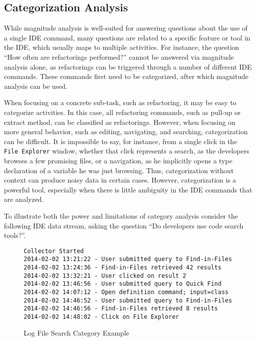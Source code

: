 \subsection{Categorization Analysis}

While magnitude analysis is well-suited for answering questions about the use of a single IDE command, many questions are related to a specific feature or tool in the IDE, which usually maps to multiple activities. For instance, the question ``How often are refactorings performed?'' cannot be answered via magnitude analysis alone, as refactorings can be triggered through a number of different IDE commands. These commands first need to be categorized, after which magnitude analysis can be used. 

When focusing on a concrete sub-task, such as refactoring, it may be easy to categorize activities. In this case, all refactoring commands, such as pull-up or extract method, can be classified as refactorings. However, when focusing on more general behavior, such as editing, navigating, and searching, categorization can be difficult. It is impossible to say, for instance, from a single click in the {\tt File Explorer} window, whether that click represents a search, as the developers browses a few promising files, or a navigation, as he implicitly opens a type declaration of a variable he was just browsing. Thus, categorization without context can produce noisy data in certain cases. However, categorization is a powerful tool, especially when there is little ambiguity in the IDE commands that are analyzed.

To illustrate both the power and limitations of category analysis consider the following IDE data stream, asking the question ``Do developers use code search tools?''. 
\begin{figure}
\hrulefill
\begin{verbatim}
Collector Started
2014-02-02 13:21:22 - User submitted query to Find-in-Files
2014-02-02 13:24:36 - Find-in-Files retrieved 42 results
2014-02-02 13:32:21 - User clicked on result 2
2014-02-02 13:46:56 - User submitted query to Quick Find
2014-02-02 14:07:12 - Open definition command; input=class
2014-02-02 14:46:52 - User submitted query to Find-in-Files
2014-02-02 14:46:56 - Find-in-Files retrieved 8 results
2014-02-02 14:48:02 - Click on File Explorer
\end{verbatim}
\hrulefill
	\caption{Log File Search Category Example}
	\label{log:logFileSearch}
\end{figure}


